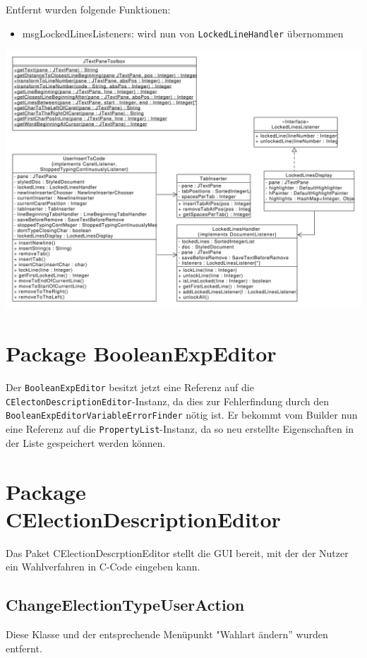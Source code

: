 \documentclass[a4paper]{scrreprt}
\begin{document}
Entfernt wurden folgende Funktionen:
\begin{itemize}
\item msgLockedLinesListeners: wird nun von \verb!LockedLineHandler! übernommen
\end{itemize}

\includegraphics[scale=0.45]{inputtocode_update.pdf}

\section{Package BooleanExpEditor}
Der \verb!BooleanExpEditor! besitzt jetzt eine Referenz auf die \verb!CElectonDescriptionEditor!-Instanz, da dies zur Fehlerfindung durch den \verb!BooleanExpEditorVariableErrorFinder! nötig ist.
\newline
Er bekommt vom Builder nun eine Referenz auf die \verb!PropertyList!-Instanz, da so neu erstellte Eigenschaften in der Liste gespeichert werden können.

\section{Package CElectionDescriptionEditor}
Das Paket CElectionDescrptionEditor stellt die GUI bereit, mit der der Nutzer ein Wahlverfahren in C-Code eingeben kann. 

\subsection{ChangeElectionTypeUserAction}
Diese Klasse und der entsprechende Menüpunkt "Wahlart ändern'' wurden entfernt.
\end{document}
